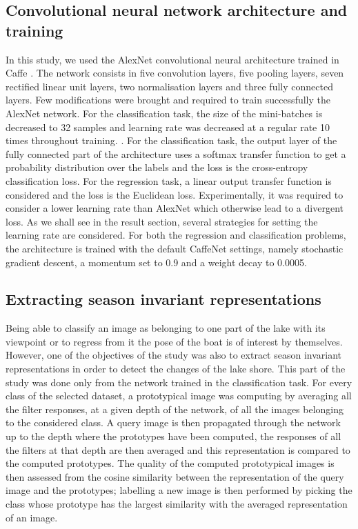 \subsection{Convolutional neural network architecture and training}

In this study, we used the AlexNet convolutional neural architecture \cite{NIPS2012_4824} trained in Caffe \cite{jia2014caffe}. The network consists in five convolution layers, five pooling layers, seven rectified linear unit layers, two normalisation layers and three fully connected layers. Few modifications were brought and required to train successfully the AlexNet network. For the classification task, the size of the mini-batches is decreased to 32 samples and learning rate was decreased at a regular rate 10 times throughout training. . For the classification task, the output layer of the fully connected part of the architecture uses a softmax transfer function to get a probability distribution over the labels and the loss is the cross-entropy classification loss. For the regression task, a linear output transfer function is considered and the loss is the Euclidean loss. Experimentally, it was required to consider a lower learning rate than AlexNet which otherwise lead to a divergent loss. As we shall see in the result section, several strategies for setting the learning rate are considered. For both the regression and classification problems, the architecture is trained with the default CaffeNet settings, namely stochastic gradient descent, a momentum set to 0.9 and a weight decay to 0.0005.


\subsection{Extracting season invariant representations}

Being able to classify an image as belonging to one part of the lake with its viewpoint or to regress from it the pose of the boat is of interest by themselves. However, one of the objectives of the study was also to extract season invariant representations in order to detect the changes of the lake shore. This part of the study was done only from the network trained in the classification task. For every class of the selected dataset, a prototypical image was computing by averaging all the filter responses, at a given depth of the network, of all the images belonging to the considered class. A query image is then propagated through the network up to the depth where the prototypes have been computed, the responses of all the filters at that depth are then averaged and this representation is compared to the computed prototypes. The quality of the computed prototypical images is then assessed from the cosine similarity between the representation of the query image and the prototypes; labelling a new image is then performed by picking the class whose prototype has the largest similarity with the averaged representation of an image.
